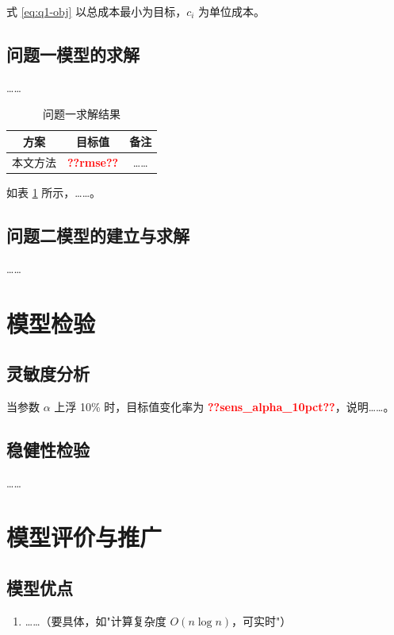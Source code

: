 \documentclass[UTF8,12pt,fontset=windows]{ctexart}
\newcommand{\res}[1]{\textcolor{red}{\textbf{??#1??}}}
\begin{document}
式 \eqref{eq:q1-obj} 以总成本最小为目标，$c_i$ 为单位成本。

\subsection{问题一模型的求解}

……

\begin{table}[H]
  \centering
  \caption{问题一求解结果}
  \label{tab:q1-result}
  \begin{tabular}{ccc}
    \toprule
    方案 & 目标值 & 备注 \\
    \midrule
    本文方法 & \res{rmse} & …… \\
    \bottomrule
  \end{tabular}
\end{table}

如表 \ref{tab:q1-result} 所示，……。

\subsection{问题二模型的建立与求解}

……

\section{模型检验}

\subsection{灵敏度分析}
当参数 $\alpha$ 上浮 10\% 时，目标值变化率为 \res{sens_alpha_10pct}，说明……。%

\subsection{稳健性检验}
……

\section{模型评价与推广}

\subsection{模型优点}
\begin{enumerate}
  \item ……（要具体，如"计算复杂度 $O(n\log n)$，可实时"）
\end{enumerate}
\end{document}
